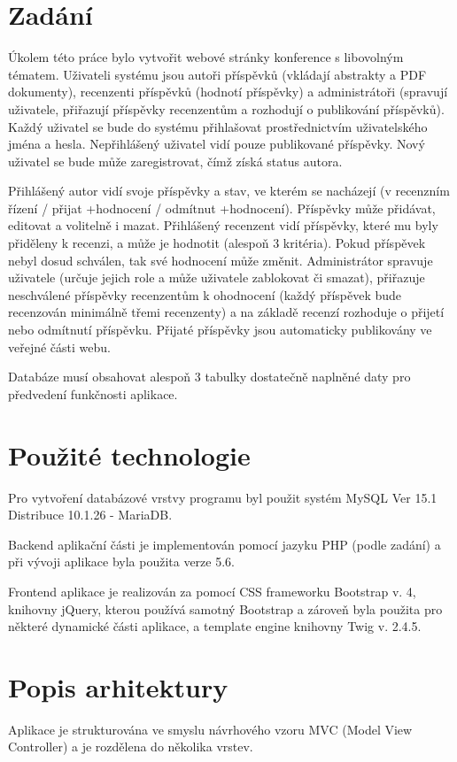 \documentclass[12pt, a4paper]{article}
\begin{document}
\section{Zadání}
\par Úkolem této práce bylo vytvořit webové stránky konference s libovolným tématem. Uživateli systému jsou autoři
příspěvků (vkládají abstrakty a PDF dokumenty), recenzenti příspěvků (hodnotí příspěvky) a administrátoři
(spravují uživatele, přiřazují příspěvky recenzentům a rozhodují o publikování příspěvků). Každý uživatel se bude do systému přihlašovat prostřednictvím uživatelského jména a hesla. Nepřihlášený uživatel vidí pouze publikované příspěvky.
Nový uživatel se bude může zaregistrovat, čímž získá status autora.
\par Přihlášený autor vidí svoje příspěvky a stav, ve kterém se nacházejí
(v recenzním řízení / přijat +hodnocení / odmítnut +hodnocení). Příspěvky může přidávat, editovat a volitelně i mazat.
Přihlášený recenzent vidí příspěvky, které mu byly přiděleny k recenzi, a může je hodnotit (alespoň 3 kritéria).
Pokud příspěvek nebyl dosud schválen, tak své hodnocení může změnit.
Administrátor spravuje uživatele (určuje jejich role a může uživatele zablokovat či smazat), přiřazuje neschválené příspěvky recenzentům k ohodnocení (každý příspěvek bude recenzován minimálně třemi recenzenty) a na základě recenzí rozhoduje o přijetí nebo odmítnutí příspěvku. Přijaté příspěvky jsou automaticky publikovány ve veřejné části webu.
\par Databáze musí obsahovat alespoň 3 tabulky dostatečně naplněné daty pro předvedení funkčnosti aplikace.

\section{Použité technologie}
\par Pro vytvoření databázové vrstvy programu byl použit systém MySQL Ver 15.1 Distribuce 10.1.26 - MariaDB.
\par Backend aplikační části je implementován pomocí jazyku PHP (podle zadání) a při vývoji aplikace byla použita verze 5.6.
\par Frontend aplikace je realizován za pomocí CSS frameworku Bootstrap v. 4, knihovny jQuery, kterou používá samotný
Bootstrap a zároveň byla použita pro některé dynamické části aplikace, a template engine knihovny Twig v. 2.4.5.

\section{Popis arhitektury}
\par Aplikace je strukturována ve smyslu návrhového vzoru MVC (Model View Controller) a je rozdělena do několika vrstev.
\end{document}
